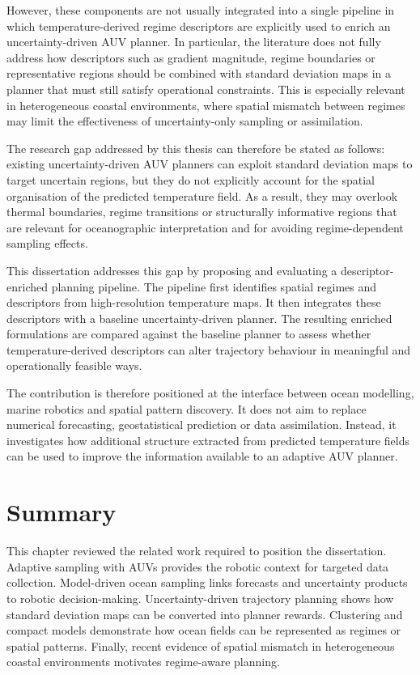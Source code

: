 However, these components are not usually integrated into a single pipeline in which temperature-derived regime descriptors are explicitly used to enrich an uncertainty-driven AUV planner. In particular, the literature does not fully address how descriptors such as gradient magnitude, regime boundaries or representative regions should be combined with standard deviation maps in a planner that must still satisfy operational constraints. This is especially relevant in heterogeneous coastal environments, where spatial mismatch between regimes may limit the effectiveness of uncertainty-only sampling or assimilation.

The research gap addressed by this thesis can therefore be stated as follows: existing uncertainty-driven AUV planners can exploit standard deviation maps to target uncertain regions, but they do not explicitly account for the spatial organisation of the predicted temperature field. As a result, they may overlook thermal boundaries, regime transitions or structurally informative regions that are relevant for oceanographic interpretation and for avoiding regime-dependent sampling effects.

This dissertation addresses this gap by proposing and evaluating a descriptor-enriched planning pipeline. The pipeline first identifies spatial regimes and descriptors from high-resolution temperature maps. It then integrates these descriptors with a baseline uncertainty-driven planner. The resulting enriched formulations are compared against the baseline planner to assess whether temperature-derived descriptors can alter trajectory behaviour in meaningful and operationally feasible ways.

The contribution is therefore positioned at the interface between ocean modelling, marine robotics and spatial pattern discovery. It does not aim to replace numerical forecasting, geostatistical prediction or data assimilation. Instead, it investigates how additional structure extracted from predicted temperature fields can be used to improve the information available to an adaptive AUV planner.

\section{Summary} \label{sec:related_work_summary}

This chapter reviewed the related work required to position the dissertation. Adaptive sampling with AUVs provides the robotic context for targeted data collection. Model-driven ocean sampling links forecasts and uncertainty products to robotic decision-making. Uncertainty-driven trajectory planning shows how standard deviation maps can be converted into planner rewards. Clustering and compact models demonstrate how ocean fields can be represented as regimes or spatial patterns. Finally, recent evidence of spatial mismatch in heterogeneous coastal environments motivates regime-aware planning.

